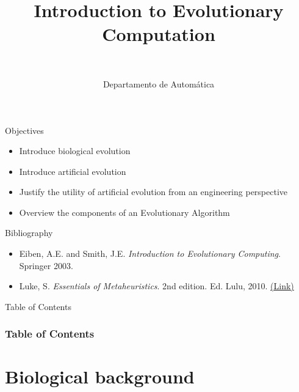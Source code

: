 \documentclass[10pt,compress]{beamer} %
\title[Introduction to Evolutionary Computation]{Introduction to Evolutionary Computation}
\author{\asignatura\\\carrera}
\institute{}
\date{Departamento de Automática}
\begin{document}
{\titlepageBlue
    \begin{frame}
        \titlepage
    \end{frame}
}

\begin{frame}[plain]{}
   \begin{block}{Objectives}
       \begin{itemize}
        \item Introduce biological evolution
        \item Introduce artificial evolution
		\item Justify the utility of artificial evolution from an engineering perspective
		\item Overview the components of an Evolutionary Algorithm
       \end{itemize}
   \end{block}

   \begin{block}{Bibliography}
   		\begin{itemize}
       \item Eiben, A.E. and Smith, J.E. \emph{Introduction to Evolutionary Computing}. Springer 2003. 
     	\item Luke, S. \emph{Essentials of Metaheuristics}. 2nd edition. Ed. Lulu, 2010. \href{https://cs.gmu.edu/~sean/book/metaheuristics/Essentials.pdf}{(Link)}
   		\end{itemize}
   \end{block}
\end{frame}

{
\begin{frame}[shrink]{Table of Contents}
 \frametitle{Table of Contents}
 \tableofcontents
\end{frame}
}

\section{Biological background}
\end{document}
